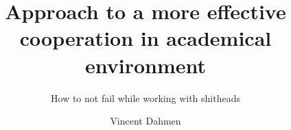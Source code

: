 \title{Approach to a more effective cooperation in academical environment}
\subtitle{How to not fail while working with shitheads}
\author{Vincent Dahmen}
